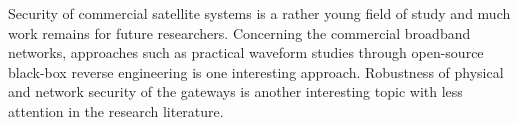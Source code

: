 \documentclass[english, 12pt, a4paper, elec, utf8, a-1b, online]{aaltothesis}
\begin{document}
Security of commercial satellite systems is a rather young field of study and much work remains for future researchers. Concerning the commercial broadband networks, approaches such as practical waveform studies through open-source black-box reverse engineering is one interesting approach. Robustness of physical and network security of the gateways is another interesting topic with less attention in the research literature.







\clearpage

\thesisbibliography




\clearpage

\thesisappendix

\end{document}
